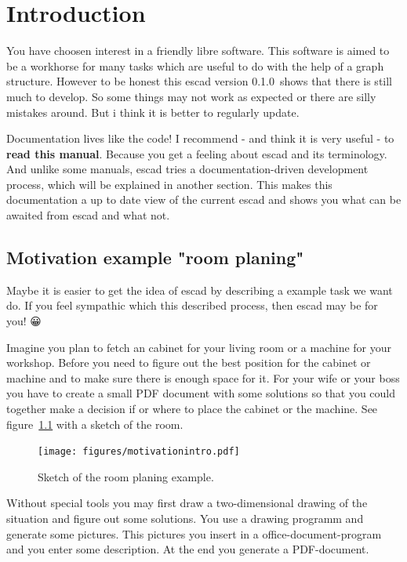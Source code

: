\documentclass[a4paper, 12pt, openany]{scrbook}
\newcommand{\EscadVersion}{0.1.0}
\begin{document}
\tableofcontents

\chapter{Introduction}
You have choosen interest in a friendly libre software. This software is aimed to be a workhorse for many tasks which are useful to do with the help of a graph structure. However to be honest this escad version \EscadVersion\ shows that there is still much to develop. So some things may not work as expected or there are silly mistakes around. But i think it is better to regularly update.

Documentation lives like the code! I recommend - and think it is very useful - to \textbf{read this manual}. Because you get a feeling about escad and its terminology. And unlike some manuals, escad tries a documentation-driven development process, which will be explained in another section. This makes this documentation a up to date view of the current escad and shows you what can be awaited from escad and what not.
\section{Motivation example  "room planing"}
Maybe it is easier to get the idea of escad by describing a example task we want do. If you feel sympathic which this described process, then escad may be for you! 😀

Imagine you plan to fetch an cabinet for your living room or a machine for your workshop. Before you need to figure out the best position for the cabinet or machine and to make sure there is enough space for it. For your wife or your boss you have to create a small PDF document with some solutions so that you could together make a decision if or where to place the cabinet or the machine. See figure~\ref{fig:motivationintro} with a sketch of the room.
\begin{figure}[htbp]
  \centering
  \texttt{[image: figures/motivationintro.pdf]}
  \caption{Sketch of the room planing example.}
  \label{fig:motivationintro}
\end{figure}
Without special tools you may first draw a two-dimensional drawing of the situation and figure out some solutions. You use a drawing programm and generate some pictures. This pictures you insert in a office-document-program and you enter some description. At the end you generate a PDF-document.
\end{document}
